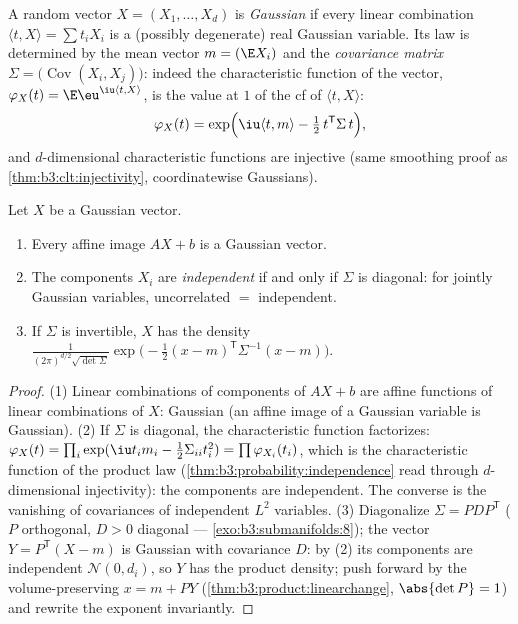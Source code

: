 \begin{definition}\label{def:b3:clt:gaussianvector}
A random vector $X = (X_1, \dots, X_d)$ is
\emph{Gaussian} if every linear
combination $\langle t, X\rangle = \sum t_iX_i$ is a
(possibly degenerate) real Gaussian variable. Its law is
determined by the mean vector $m = (\E X_i)$ and the
\emph{covariance matrix} $\Sigma = \bigl(\operatorname{Cov}
(X_i, X_j)\bigr)$: indeed the characteristic function of the
vector, $\varphi_X(t) = \E\eu^{\iu\langle t, X\rangle}$, is
the value at $1$ of the cf of $\langle t, X\rangle$:
\[
\varphi_X(t) = \exp\Bigl(\iu\langle t, m\rangle -
\tfrac12\,t^{\mathsf T}\Sigma\,t\Bigr),
\]
and $d$-dimensional characteristic functions are injective
(same smoothing proof as \cref{thm:b3:clt:injectivity},
coordinatewise Gaussians).
\end{definition}

\begin{theorem}\label{thm:b3:clt:gaussianvector}
Let $X$ be a Gaussian vector.
\begin{enumerate}
  \item Every affine image $AX + b$ is a Gaussian vector.
  \item The components $X_i$ are \emph{independent} if and
        only if $\Sigma$ is diagonal: for jointly Gaussian
        variables, uncorrelated $=$ independent.
  \item If $\Sigma$ is invertible, $X$ has the density
        $\frac{1}{(2\pi)^{d/2}\sqrt{\det\Sigma}}
        \exp\bigl(-\frac12(x - m)^{\mathsf T}\Sigma^{-1}(x -
        m)\bigr)$.
\end{enumerate}
\end{theorem}

\begin{proof}
(1) Linear combinations of components of $AX + b$ are affine
functions of linear combinations of $X$: Gaussian (an affine
image of a Gaussian variable is Gaussian).
(2) If $\Sigma$ is diagonal, the characteristic function
factorizes: $\varphi_X(t) = \prod_i\exp(\iu t_im_i -
\frac12\Sigma_{ii}t_i^2) = \prod\varphi_{X_i}(t_i)$, which is
the characteristic function of the product law
(\cref{thm:b3:probability:independence} read through
$d$-dimensional injectivity): the components are independent.
The converse is the vanishing of covariances of independent
$L^2$ variables.
(3) Diagonalize $\Sigma = P D P^{\mathsf T}$ ($P$ orthogonal,
$D > 0$ diagonal --- \cref{exo:b3:submanifolds:8}); the
vector $Y = P^{\mathsf T}(X - m)$ is Gaussian with
covariance $D$: by (2) its components are independent
$\mathcal N(0, d_i)$, so $Y$ has the product density; push
forward by the volume-preserving $x = m + PY$
(\cref{thm:b3:product:linearchange}, $\abs{\det P} = 1$) and
rewrite the exponent invariantly.
\end{proof}

